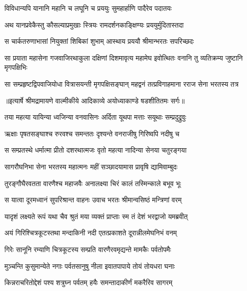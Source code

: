 \twolineshloka
{विविधान्यपि यानानि महानि च लघूनि च}
{प्रययुः सुमहार्हाणि पादैरेव पदातयः} %

\twolineshloka
{अथ यानप्रवेकैस्तु कौसल्याप्रमुखाः स्त्रियः}
{रामदर्शनकाङ्क्षिण्यः प्रययुर्मुदितास्तदा} %

\twolineshloka
{स चार्कतरुणाभासां नियुक्तां शिबिकां शुभाम्}
{आस्थाय प्रययौ श्रीमान्भरतः सपरिच्छदः} %

\threelineshloka
{सा प्रयाता महासेना गजवाजिरथाकुला}
{दक्षिणां दिशमावृत्य महामेघ इवोत्थितः}
{वनानि तु व्यतिक्रम्य जुष्टानि मृगपक्षिभिः} %

\fourlineindentedshloka
{सा सम्प्रहृष्टद्विपवाजियोधा}
{वित्रासयन्ती मृगपक्षिसङ्घान्}
{महद्वनं तत्प्रविगाहमाना}
{रराज सेना भरतस्य तत्र} %


{॥इत्यार्षे श्रीमद्रामायणे वाल्मीकीये आदिकाव्ये अयोध्याकाण्डे षडशीतितमः सर्गः॥}


\twolineshloka
{तया महत्या यायिन्या ध्वजिन्या वनवासिनः}
{अर्दिता यूथपा मत्ताः सयूथाः सम्प्रदुद्रुवुः} %

\twolineshloka
{ऋक्षाः पृषतसङ्घाश्च रुरवश्च समन्ततः}
{दृश्यन्ते वनराजीषु गिरिष्वपि नदीषु च} %

\twolineshloka
{स सम्प्रतस्थे धर्मात्मा प्रीतो दशरथात्मजः}
{वृतो महत्या नादिन्या सेनया चतुरङ्गया} %

\twolineshloka
{सागरौघनिभा सेना भरतस्य महात्मनः}
{महीं सञ्छादयामास प्रावृषि द्यामिवाम्बुदः} %

\twolineshloka
{तुरङ्गौघैरवतता वारणैश्च महाजवैः}
{अनालक्ष्या चिरं कालं तस्मिन्काले बभूव भूः} %

\twolineshloka
{स यात्वा दूरमध्वानं सुपरिश्रान्त वाहनः}
{उवाच भरतः श्रीमान्वसिष्ठं मन्त्रिणां वरम्} %

\twolineshloka
{यादृशं लक्ष्यते रूपं यथा चैव श्रुतं मया}
{व्यक्तं प्राप्ताः स्म तं देशं भरद्वाजो यमब्रवीत्} %

\twolineshloka
{अयं गिरिश्चित्रकूटस्तथा मन्दाकिनी नदी}
{एतत्प्रकाशते दूरान्नीलमेघनिभं वनम्} %

\twolineshloka
{गिरेः सानूनि रम्याणि चित्रकूटस्य सम्प्रति}
{वारणैरवमृद्यन्ते मामकैः पर्वतोपमैः} %

\twolineshloka
{मुञ्चन्ति कुसुमान्येते नगाः पर्वतसानुषु}
{नीला इवातपापाये तोयं तोयधरा घनाः} %

\twolineshloka
{किन्नराचरितोद्देशं पश्य शत्रुघ्न पर्वतम्}
{हयैः समन्तादाकीर्णं मकरैरिव सागरम्} %

